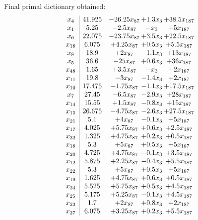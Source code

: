 \documentclass[11pt]{article}
\begin{document}
 Final primal dictionary obtained: 
\[\begin{array}{c| c c@{\hskip 2pt} c@{\hskip 2pt} c@{\hskip 2pt} }
 x_{4}   &  41.925 & -26.25 x_{87} & + 1.3 x_{3} & + 38.5 x_{187}\\
 x_{1}   &  5.25 & -2.5 x_{87} & - x_{3} & + 5 x_{187}\\
 x_{6}   &  22.075 & -23.75 x_{87} & + 3.5 x_{3} & + 22.5 x_{187}\\
 x_{16}   &  6.075 & + 4.25 x_{87} & + 0.5 x_{3} & + 5.5 x_{187}\\
 x_{8}   &  18.9 & + 2 x_{87} & -1.1 x_{3} & + 13 x_{187}\\
 x_{5}   &  36.6 & -25 x_{87} & + 0.6 x_{3} & + 36 x_{187}\\
 x_{48}   &  1.65 & + 3.5 x_{87} & - x_{3} & + 2 x_{187}\\
 x_{11}   &  19.8 & -3 x_{87} & -1.4 x_{3} & + 2 x_{187}\\
 x_{10}   &  17.475 & -1.75 x_{87} & -1.1 x_{3} & + 17.5 x_{187}\\
 x_{7}   &  27.45 & -6.5 x_{87} & -2.9 x_{3} & + 28 x_{187}\\
 x_{14}   &  15.55 & + 1.5 x_{87} & -0.8 x_{3} & + 15 x_{187}\\
 x_{15}   &  26.675 & -4.75 x_{87} & -2.6 x_{3} & + 27.5 x_{187}\\
 x_{21}   &  5.1 & + 4 x_{87} & -0.1 x_{3} & + 5 x_{187}\\
 x_{17}   &  4.025 & + 5.75 x_{87} & + 0.6 x_{3} & + 2.5 x_{187}\\
 x_{32}   &  1.325 & + 4.75 x_{87} & + 0.2 x_{3} & + 0.5 x_{187}\\
 x_{18}   &  5.3 & + 5 x_{87} & + 0.5 x_{3} & + 5 x_{187}\\
 x_{20}   &  4.725 & + 4.75 x_{87} & -0.1 x_{3} & + 3.5 x_{187}\\
 x_{12}   &  5.875 & + 2.25 x_{87} & -0.4 x_{3} & + 5.5 x_{187}\\
 x_{22}   &  5.3 & + 5 x_{87} & + 0.5 x_{3} & + 5 x_{187}\\
 x_{19}   &  1.625 & + 4.75 x_{87} & + 0.6 x_{3} & + 0.5 x_{187}\\
 x_{24}   &  5.525 & + 5.75 x_{87} & + 0.5 x_{3} & + 4.5 x_{187}\\
 x_{25}   &  5.175 & + 5.25 x_{87} & -0.1 x_{3} & + 4.5 x_{187}\\
 x_{23}   &  1.7 & + 2 x_{87} & + 0.8 x_{3} & + 2 x_{187}\\
 x_{27}   &  6.075 & + 3.25 x_{87} & + 0.2 x_{3} & + 5.5 x_{187}\\

\end{array}\]
\end{document}
